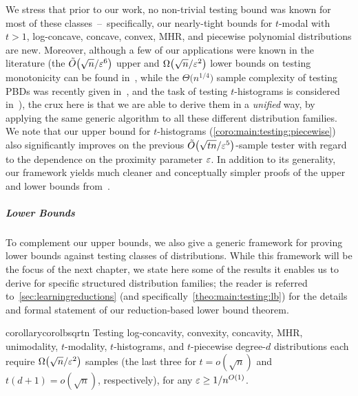 We stress that prior to our work, no non-trivial testing bound was known for most of these classes~--~specifically, our nearly-tight bounds for
$t$-modal with $t>1$, log-concave, concave, convex, MHR, and piecewise polynomial distributions are new. Moreover, although a few of our applications 
were known in the literature (the $\tildeO{\sqrt{n}/\eps^6}$ upper and $\bigOmega{\sqrt{n}/\eps^2}$ lower bounds on testing monotonicity can be found in~\cite{BKR:04}, while the $\Theta\big({n^{1/4}}\big)$ sample complexity of testing PBDs was recently given\footnotemark{} in~\cite{AD:15}, and the task of testing $t$-histograms is considered in~\cite{ILR:12}), the crux here is that we are able to derive them in a \emph{unified} way, by applying the same generic algorithm to all these different distribution families. 
We note that our upper bound for $t$-histograms (\cref{coro:main:testing:piecewise}) also significantly improves on the previous $\tildeO{\sqrt{tn}/\eps^5}$-sample tester with regard to the dependence on the proximity parameter $\varepsilon$. In addition to its generality, our framework yields much cleaner and conceptually simpler proofs of the upper and lower bounds from~\cite{AD:15}.

\subparagraph{Lower Bounds} To complement our upper bounds, we also give a generic framework for proving lower bounds against testing classes of distributions. While this framework will be the focus of the next chapter, we state here some of the results it enables us to derive for specific structured distribution families; the reader is referred to~\cref{sec:learningreductions} (and specifically~\cref{theo:main:testing:lb}) for the details and formal statement of our reduction-based lower bound theorem.

\begin{restatable}{corollary}{corolbsqrtn}\label{coro:lb:sqrtn}
  Testing log-concavity, convexity, concavity, MHR, unimodality, $t$-modality, $t$-histograms, and $t$-piecewise degree-$d$ distributions each require $\bigOmega{{\sqrt{n}}/{\eps^2}}$ samples (the last three for $t = o(\sqrt{n})$ and $t(d+1) = o(\sqrt{n})$, respectively), for any $\varepsilon\geq 1/n^{O(1)}$.
\end{restatable}

